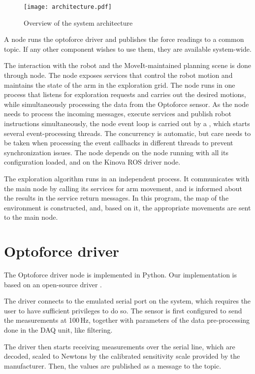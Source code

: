 \documentclass[buriama8_dp.tex]{subfiles}
\begin{document}
\begin{figure}[ht]
  \centering
  \texttt{[image: architecture.pdf]}
  \caption{Overview of the system architecture}
  \label{fig:arch}
\end{figure}

A node runs the optoforce driver and publishes the force readings to a common topic. If any other component wishes to use them, they are available system-wide.

The interaction with the robot and the MoveIt-maintained planning scene is done through  node. The node exposes services that control the robot motion and maintains the state of the arm in the exploration grid. The node runs in one process that listens for exploration requests and carries out the desired motions, while simultaneously processing the data from the Optoforce sensor. As the node needs to process the incoming messages, execute services and publish robot instructions simultaneously, the node event loop is carried out by a , which starts several event-processing threads. The concurrency is automatic, but care needs to be taken when processing the event callbacks in different threads to prevent synchronization issues. The node depends on the  node running with all its configuration loaded, and on the Kinova ROS driver node.

The exploration algorithm runs in an independent process. It communicates with the main node by calling its services for arm movement, and is informed about the results in the service return messages. In this program, the map of the environment is constructed, and, based on it, the appropriate movements are sent to the main node.

\section{Optoforce driver}
\label{sec:opto_driver}

The Optoforce driver node is implemented in Python. Our implementation is based on an open-source driver \cite{opto_driver}.

The driver connects to the emulated serial port on the system, which requires the user to have sufficient privileges to do so. The sensor is first configured to send the measurements at 100\,Hz, together with parameters of the data pre-processing done in the DAQ unit, like filtering.

The driver then starts receiving measurements over the serial line, which are decoded, scaled to Newtons by the calibrated sensitivity scale provided by the manufacturer. Then, the values are published as a  message to the \code{\optoforce} topic.
\end{document}
